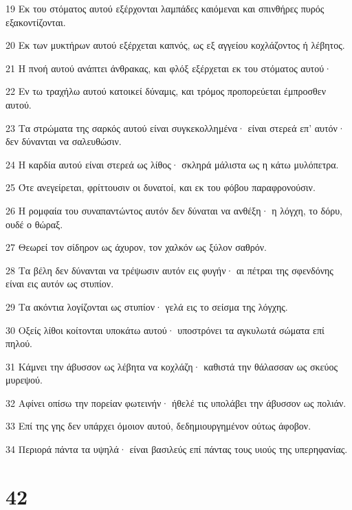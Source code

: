 \par 19 Εκ του στόματος αυτού εξέρχονται λαμπάδες καιόμεναι και σπινθήρες πυρός εξακοντίζονται.
\par 20 Εκ των μυκτήρων αυτού εξέρχεται καπνός, ως εξ αγγείου κοχλάζοντος ή λέβητος.
\par 21 Η πνοή αυτού ανάπτει άνθρακας, και φλόξ εξέρχεται εκ του στόματος αυτού·
\par 22 Εν τω τραχήλω αυτού κατοικεί δύναμις, και τρόμος προπορεύεται έμπροσθεν αυτού.
\par 23 Τα στρώματα της σαρκός αυτού είναι συγκεκολλημένα· είναι στερεά επ' αυτόν· δεν δύνανται να σαλευθώσιν.
\par 24 Η καρδία αυτού είναι στερεά ως λίθος· σκληρά μάλιστα ως η κάτω μυλόπετρα.
\par 25 Ότε ανεγείρεται, φρίττουσιν οι δυνατοί, και εκ του φόβου παραφρονούσιν.
\par 26 Η ρομφαία του συναπαντώντος αυτόν δεν δύναται να ανθέξη· η λόγχη, το δόρυ, ουδέ ο θώραξ.
\par 27 Θεωρεί τον σίδηρον ως άχυρον, τον χαλκόν ως ξύλον σαθρόν.
\par 28 Τα βέλη δεν δύνανται να τρέψωσιν αυτόν εις φυγήν· αι πέτραι της σφενδόνης είναι εις αυτόν ως στυπίον.
\par 29 Τα ακόντια λογίζονται ως στυπίον· γελά εις το σείσμα της λόγχης.
\par 30 Οξείς λίθοι κοίτονται υποκάτω αυτού· υποστρόνει τα αγκυλωτά σώματα επί πηλού.
\par 31 Κάμνει την άβυσσον ως λέβητα να κοχλάζη· καθιστά την θάλασσαν ως σκεύος μυρεψού.
\par 32 Αφίνει οπίσω την πορείαν φωτεινήν· ήθελέ τις υπολάβει την άβυσσον ως πολιάν.
\par 33 Επί της γης δεν υπάρχει όμοιον αυτού, δεδημιουργημένον ούτως άφοβον.
\par 34 Περιορά πάντα τα υψηλά· είναι βασιλεύς επί πάντας τους υιούς της υπερηφανίας.

\chapter{42}

